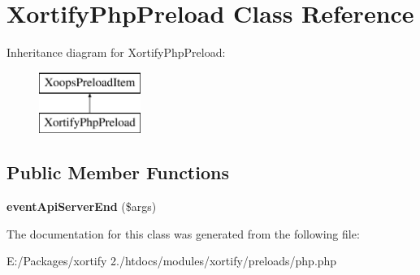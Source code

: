 \hypertarget{class_xortify_php_preload}{\section{Xortify\-Php\-Preload Class Reference}
\label{class_xortify_php_preload}
}
Inheritance diagram for Xortify\-Php\-Preload\-:\begin{figure}[H]
\begin{center}
\leavevmode
\includegraphics[height=2.000000cm]{class_xortify_php_preload}
\end{center}
\end{figure}
\subsection*{Public Member Functions}
\begin{DoxyCompactItemize}
\item 
\hypertarget{class_xortify_php_preload_a78cd63c1cbc39c648b74f201a16b018c}{{\bfseries event\-Api\-Server\-End} (\$args)}\label{class_xortify_php_preload_a78cd63c1cbc39c648b74f201a16b018c}

\end{DoxyCompactItemize}


The documentation for this class was generated from the following file\-:\begin{DoxyCompactItemize}
\item 
E\-:/\-Packages/xortify 2./htdocs/modules/xortify/preloads/php.\-php\end{DoxyCompactItemize}
